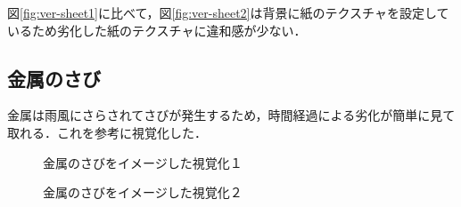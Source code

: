 図\ref{fig:ver-sheet1}に比べて，図\ref{fig:ver-sheet2}は背景に紙のテクスチャを設定しているため劣化した紙のテクスチャに違和感が少ない．

\subsection{金属のさび}
\label{subsec:ver-tex-russet}

金属は雨風にさらされてさびが発生するため，時間経過による劣化が簡単に見て取れる．これを参考に視覚化した．

\begin{figure}[htbp]
  \begin{minipage}{0.5\hsize}
    \begin{center}
    \end{center}
    \caption{金属のさびをイメージした視覚化１}
    \label{fig:ver-russet1}
  \end{minipage}
  \begin{minipage}{0.5\hsize}
    \begin{center}
    \end{center}
    \caption{金属のさびをイメージした視覚化２}
    \label{fig:ver-russet2}
  \end{minipage}
\end{figure}

